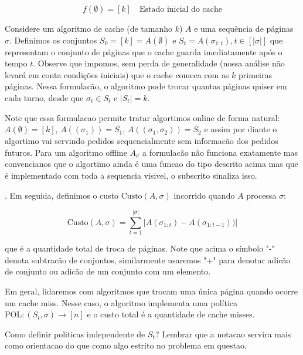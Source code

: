 \documentclass[a4paper,oneside,reqno,12pt]{amsart}
\begin{document}
\begin{equation}
  f(\emptyset)  = [k] \quad \text{Estado inicial do cache}
\end{equation}

Considere um algoritmo de cache (de tamanho $k$) $A$ e uma sequência de páginas $\sigma$. Definimos os conjuntos $S_0 = [k] = A(\emptyset)$ e $S_t = A(\sigma_{1:t}), t \in [|\sigma|]$ que representam o conjunto de páginas que o cache guarda imediatamente após o tempo $t$. Observe que impomos, sem perda de generalidade (nossa análise não levará em conta condições iniciais) que o cache comeca com as $k$ primeiras páginas. Nessa formulacão, o algoritmo pode trocar quantas páginas quiser em cada turno, desde que $\sigma_t \in S_t$ e $|S_t| = k$.

Note que essa formulacao permite tratar algortimos online de forma natural: $A(\emptyset) = [k]$, $A((\sigma_1)) = S_1$, $A((\sigma_1, \sigma_2)) = S_2$ e assim por diante o algortimo vai servindo pedidos sequencialmente sem informacão dos pedidos futuros. Para um algoritmo offline $A_{\sigma}$ a formulacão não funciona exatamente mas convencianos que o algortimo ainda é uma funcao do tipo descrito acima mas que é implementado com toda a sequencia visivel, o subscrito sinaliza isso. 

. Em seguida, definimos o custo $\text{Custo}(A, \sigma)$ incorrido quando $A$ processa $\sigma$:

\begin{equation}
  \text{Custo}(A, \sigma) = \sum_{t=1}^{|\sigma|} |A(\sigma_{1:t}) - A(\sigma_{1:t-1}))|
\end{equation}

que é a quantidade total de troca de páginas. Note que acima o símbolo "-" denota subtracão de conjuntos, similarmente usaremos "+" para denotar adicão de conjunto ou adicão de um conjunto com um elemento.

Em geral, lidaremos com algoritmos que trocam uma única página quando ocorre um cache miss. Nesse caso, o algoritmo implementa uma política $\text{POL}: (S_t, \sigma) \to [n]$ e o custo total é a quantidade de cache misses.

Como definir politicas independente de $S_t$? Lembrar que a notacao servira mais como orientacao do que como algo estrito no problema em questao.
\end{document}
